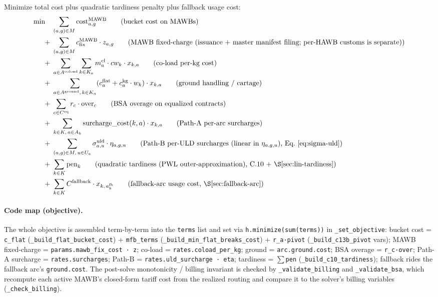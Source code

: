 \documentclass[11pt,a4paper]{article}
\theoremstyle{definition}
\begin{document}
Minimize total cost plus quadratic tardiness penalty plus fallback usage cost:
\begin{align}
  \min \quad
  & \sum_{(a,g) \in M} \text{cost}^{\text{MAWB}}_{a,g}
    \tag{bucket cost on MAWBs} \\
  +\;
  & \sum_{(a,g) \in M} c^{\text{MAWB}}_{\text{fix}} \cdot z_{a,g}
    \tag{MAWB fixed-charge (issuance + master manifest filing; per-HAWB customs is separate)} \\
  +\;
  & \sum_{a \in A^{\text{coload}}} \sum_{k \in K_a} m_a^{\text{cl}} \cdot cw_k \cdot x_{k,a}
    \tag{co-load per-kg cost} \\
  +\;
  & \sum_{a \in A^{\text{ground}},\, k \in K_a} (c_a^{\text{flat}} + c_a^{\text{kg}} \cdot w_k) \cdot x_{k,a}
    \tag{ground handling / cartage} \\
  +\;
  & \sum_{c \in C^{\text{eq}}} r_c \cdot \text{over}_c
    \tag{BSA overage on equalized contracts} \\
  +\;
  & \sum_{k \in K,\, a \in A_k} \text{surcharge\_cost}(k, a) \cdot x_{k,a}
    \tag{Path-A per-arc surcharges} \\
  +\;
  & \sum_{(a,g) \in M,\, u \in U_a} \sigma^{\text{uld}}_{a,u} \cdot \eta_{a,g,u}
    \tag{Path-B per-ULD surcharges (linear in $\eta_{a,g,u}$), Eq.~\ref{eq:sigma-uld}} \\
  +\;
  & \sum_{k \in K} \text{pen}_k
    \tag{quadratic tardiness (PWL outer-approximation), C.10 + \S\ref{sec:lin-tardiness}} \\
  +\;
  & \sum_{k \in K} C^{\text{fallback}} \cdot x_{k,\, a^{\text{fb}}_k}
    \tag{fallback-arc usage cost, \S\ref{sec:fallback-arc}}
\end{align}

\paragraph{Code map (objective).} The whole objective is assembled term-by-term into the
\texttt{terms} list and set via \texttt{h.minimize(sum(terms))} in \texttt{\_set\_objective}: bucket
cost = \texttt{c\_flat} (\texttt{\_build\_flat\_bucket\_cost}) $+$ \texttt{mfb\_terms}
(\texttt{\_build\_min\_flat\_breaks\_cost}) $+$ \texttt{r\_a·pivot} (\texttt{\_build\_c13b\_pivot}
vars); MAWB fixed-charge = \texttt{params.mawb\_fix\_cost · z}; co-load = \texttt{rates.coload\_per\_kg};
ground = \texttt{arc.ground.cost}; BSA overage = \texttt{r\_c·over}; Path-A surcharge =
\texttt{rates.surcharges}; Path-B = \texttt{rates.uld\_surcharge · eta}; tardiness = $\sum$\texttt{pen}
(\texttt{\_build\_c10\_tardiness}); fallback rides the fallback arc's \texttt{ground.cost}. The
post-solve monotonicity / billing invariant is checked by \texttt{\_validate\_billing} and
\texttt{\_validate\_bsa}, which recompute each active MAWB's closed-form tariff cost from the
realized routing and compare it to the solver's billing variables (\texttt{\_check\_billing}).
\end{document}
